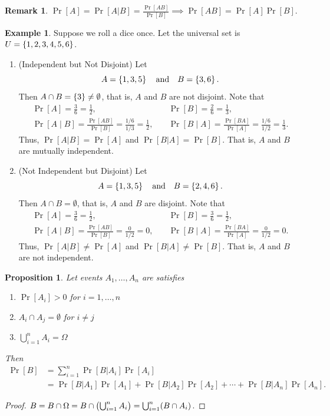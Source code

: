 \documentclass[12pt,openany]{book}
\newtheorem{proposition}[theorem]{Proposition}
\theoremstyle{definition}
\newtheorem{remark}{Remark}[chapter]
\newtheorem{example}{Example}[chapter]
\begin{document}
	\begin{remark}
		$\displaystyle\Pr[A]=\Pr[A|B]=\frac{\Pr[AB]}{\Pr[B]}\implies \Pr[AB]=\Pr[A]\Pr[B]$.
	\end{remark}
	\vspace{10pt}
	\begin{example}
		Suppose we roll a dice once. Let the universal set is $U=\set{1,2,3,4,5,6}$.
		\begin{enumerate}[(1)]
			\item (Independent but Not Disjoint) Let \[
			A=\set{1,3,5}\quad\text{and}\quad B=\set{3,6}.
			\] Then $A\cap B=\set{3}\neq\emptyset$, that is, $A$ and $B$ are not disjoint. Note that \begin{align*}
				\Pr[A]=\frac{3}{6}=\frac{1}{2},\quad&\Pr[B]=\frac{2}{6}=\frac{1}{3},\\
				\Pr[A\mid B]=\frac{\Pr[AB]}{\Pr[B]}=\frac{1/6}{1/3}=\frac{1}{2},\quad&\Pr[B\mid A]=\frac{\Pr[BA]}{\Pr[A]}=\frac{1/6}{1/2}=\frac{1}{3}.
			\end{align*} Thus, $\Pr[A|B]=\Pr[A]$ and $\Pr[B|A]=\Pr[B]$. That is, $A$ and $B$ are mutually independent.
			\item (Not Independent but Disjoint) Let \[
			A=\set{1,3,5}\quad\text{and}\quad B=\set{2,4,6}.
			\] Then $A\cap B=\emptyset$, that is, $A$ and $B$ are disjoint. Note that \begin{align*}
				\Pr[A]=\frac{3}{6}=\frac{1}{2},\quad&\Pr[B]=\frac{3}{6}=\frac{1}{2},\\
				\Pr[A\mid B]=\frac{\Pr[AB]}{\Pr[B]}=\frac{0}{1/2}=0,\quad&\Pr[B\mid A]=\frac{\Pr[BA]}{\Pr[A]}=\frac{0}{1/2}=0.
			\end{align*} Thus, $\Pr[A|B]\neq\Pr[A]$ and $\Pr[B|A]\neq\Pr[B]$. That is, $A$ and $B$ are not independent.
		\end{enumerate}
	\end{example}
	\vspace{20pt}
	\begin{tcolorbox}[colback=white,colframe=procolor,arc=5pt,title={\color{white}\bf Rule of Total Probailtiy}]
		\begin{proposition}
			Let events $A_1,\dots,A_n$ are satisfies
			\begin{enumerate}[(1)]
				\item $\Pr[A_i]>0$ for $i=1,\dots,n$
				\item $A_i\cap A_j=\emptyset$ for $i\neq j$
				\item $\bigcup_{i=1}^nA_i=\Omega$
			\end{enumerate} Then \begin{align*}
				\Pr[B]&=\sum_{i=1}^n\Pr[B|A_i]\Pr[A_i]\\
				&=\Pr[B|A_1]\Pr[A_1]+\Pr[B|A_2]\Pr[A_2]+\cdots+\Pr[B|A_n]\Pr[A_n].
			\end{align*}
		\end{proposition}
	\end{tcolorbox}
	\begin{proof}
		$B=B\cap\Omega=B\cap\del{\bigcup_{i=1}^nA_i}=\bigcup_{i=1}^n(B\cap A_i)$.
	\end{proof}
	\vspace{20pt}
\end{document}
